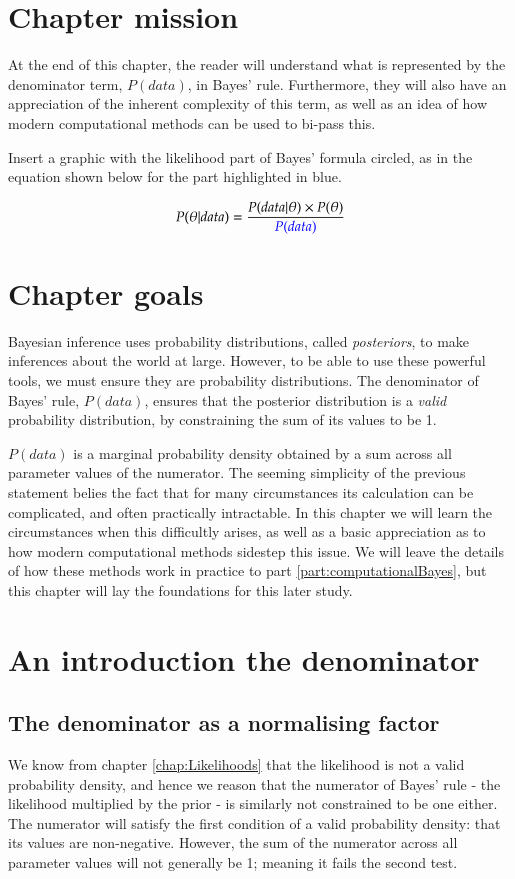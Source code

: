 \documentclass[11pt,fullpage]{book}
\begin{document}
\section{Chapter mission}
At the end of this chapter, the reader will understand what is represented by the denominator term, $P(data)$, in Bayes' rule. Furthermore, they will also have an appreciation of the inherent complexity of this term, as well as an idea of how modern computational methods can be used to bi-pass this.

Insert a graphic with the likelihood part of Bayes' formula circled, as in the equation shown below for the part highlighted in blue.

\begin{equation}
P(\theta|data) = \frac{P(data|\theta)\times P(\theta)}{{\color{blue}P(data)}}
\end{equation}\label{eq:Denominator_BayesHighlighted}


\section{Chapter goals}
Bayesian inference uses probability distributions, called \textit{posteriors}, to make inferences about the world at large. However, to be able to use these powerful tools, we must ensure they are probability distributions. The denominator of Bayes' rule, $P(data)$, ensures that the posterior distribution is a \textit{valid} probability distribution, by constraining the sum of its values to be 1. 

$P(data)$ is a marginal probability density obtained by a sum across all parameter values of the numerator. The seeming simplicity of the previous statement belies the fact that for many circumstances its calculation can be complicated, and often practically intractable. In this chapter we will learn the circumstances when this difficultly arises, as well as a basic appreciation as to how modern computational methods sidestep this issue. We will leave the details of how these methods work in practice to part \ref{part:computationalBayes}, but this chapter will lay the foundations for this later study.

\section{An introduction the denominator}
\subsection{The denominator as a normalising factor}
We know from chapter \ref{chap:Likelihoods} that the likelihood is not a valid probability density, and hence we reason that the numerator of Bayes' rule - the likelihood multiplied by the prior - is similarly not constrained to be one either. The numerator will satisfy the first condition of a valid probability density: that its values are non-negative. However, the sum of the numerator across all parameter values will not generally be 1; meaning it fails the second test.
\end{document}
